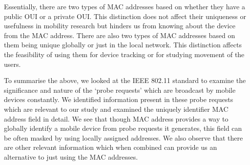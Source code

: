 Essentially, there are two types of MAC addresses based on whether they have a public OUI or a private OUI.
This distinction does not affect their uniqueness or usefulness in mobility research but hinders us from knowing about the device from the MAC address.
There are also two types of MAC addresses based on them being unique globally or just in the local network.
This distinction affects the feasibility of using them for device tracking or for studying movement of the users.

To summarise the above, we looked at the IEEE 802.11 standard to examine the significance and nature of the `probe requests' which are broadcast by mobile devices constantly.
We identified information present in these probe requests which are relevant to our study and examined the uniquely identifier MAC address field in detail.
We see that though MAC address provides a way to globally identify a mobile device from probe requests it generates, this field can be often masked by using locally assigned addresses.
We also observe that there are other relevant information which when combined can provide us an alternative to just using the MAC addresses.





